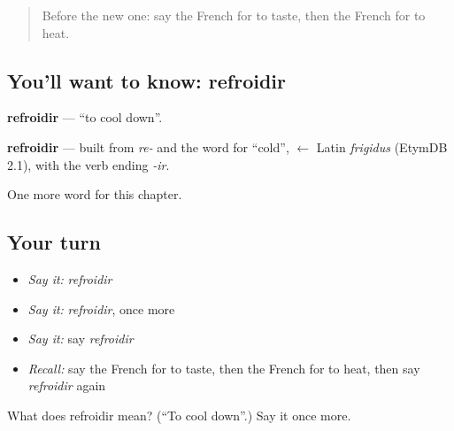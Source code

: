 \begin{quote}
Before the new one: say the French for to taste, then the French for to heat.
\end{quote}

\subsection*{You'll want to know: refroidir}
\textbf{refroidir} — \textquotedblleft{}to cool down\textquotedblright{}.

\begin{cousinweb}
\textbf{refroidir} — built from \emph{re-} and the word for \textquotedblleft{}cold\textquotedblright{}, $\leftarrow$ Latin \emph{frigidus} (EtymDB 2.1), with the verb ending \emph{-ir}.
\end{cousinweb}

\begin{grammarlens}[title={What you've built}]
One more word for this chapter.
\end{grammarlens}

\subsection*{Your turn}
\begin{itemize}
\raggedright
  \item \emph{Say it:} \emph{refroidir}
  \item \emph{Say it:} \emph{refroidir}, once more
  \item \emph{Say it:} say \emph{refroidir}
  \item \emph{Recall:} say the French for to taste, then the French for to heat, then say \emph{refroidir} again
\end{itemize}

\begin{tcolorbox}[breakable,colback=teal!4,colframe=teal!35!black,title={Before you move on}]
What does refroidir mean? (\textquotedblleft{}To cool down\textquotedblright{}.) Say it once more.
\end{tcolorbox}
